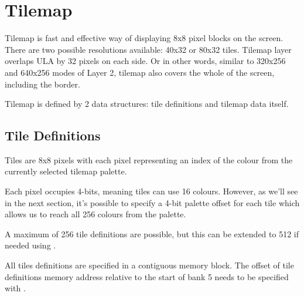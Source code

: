 \section{Tilemap}
\label{zx_next_tilemap}


Tilemap is fast and effective way of displaying 8x8 pixel blocks on the screen. There are two possible resolutions available: 40x32 or 80x32 tiles. Tilemap layer overlaps ULA by 32 pixels on each side. Or in other words, similar to 320x256 and 640x256 modes of Layer 2, tilemap also covers the whole of the screen, including the border.

Tilemap is defined by 2 data structures: tile definitions and tilemap data itself.


\subsection{Tile Definitions}

Tiles are 8x8 pixels with each pixel representing an index of the colour from the currently selected tilemap palette.

Each pixel occupies 4-bits, meaning tiles can use 16 colours. However, as we'll see in the next section, it's possible to specify a 4-bit palette offset for each tile which allows us to reach all 256 colours from the palette.

A maximum of 256 tile definitions are possible, but this can be extended to 512 if needed using .

All tiles definitions are specified in a contiguous memory block. The offset of tile definitions memory address relative to the start of bank 5 needs to be specified with .


